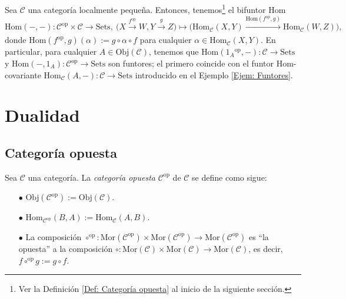\documentclass[tesis]{subfiles}
\begin{document}
\begin{Ejem}\label{Ejem: Bifuntor}
    Sea $\mathscr{C}$ una categoría localmente pequeña. Entonces, tenemos\footnote{Ver la Definición \ref{Def: Categoría opuesta} al inicio de la siguiente sección.} el bifuntor Hom
    \[
        \text{Hom}(-,-):\mathscr{C}^\text{op}\times\mathscr{C}\to \text{Sets}, \ \big( X\xrightarrow[]{f^\text{op}}W, Y\xrightarrow[]{g}Z \big) \mapsto \big( \text{Hom}_\mathscr{C}(X,Y)\xrightarrow[]{\text{Hom}(f^\text{op},g)} \text{Hom}_\mathscr{C}(W,Z) \big),
    \] 
    donde $\text{Hom}(f^\text{op},g)(\alpha) := g\circ\alpha\circ f$ para cualquier $\alpha\in\text{Hom}_\mathscr{C}(X,Y)$. En particular, para cualquier $A\in\text{Obj}(\mathscr{C})$, tenemos que $\text{Hom}(1_A{}^\text{op},-):\mathscr{C}\to \text{Sets}$ y $\text{Hom}(-,1_A):\mathscr{C}^\text{op}\to \text{Sets}$ son funtores; el primero coincide con el funtor Hom-covariante $\text{Hom}_\mathscr{C}(A,-):\mathscr{C}\to \text{Sets}$ introducido en el Ejemplo \ref{Ejem: Funtores}.
\end{Ejem}

\section{Dualidad} \label{Sec: Dualidad}

\subsection*{Categoría opuesta} \label{Ssec: Categoría opuesta}

\begin{Def} \label{Def: Categoría opuesta}
    
    Sea $\mathscr{C}$ una categoría. La \emph{categoría opuesta} $\mathscr{C}^{\text{op}}$ de $\mathscr{C}$ se define como sigue:
    
    \begin{itemize}
        \item[$\bullet$] $\text{Obj}(\mathscr{C}^{\text{op}}):=\text{Obj}(\mathscr{C})$.
    
        \item[$\bullet$] $\text{Hom}_{\mathscr{C}^{\text{op}}}(B,A):=\text{Hom}_\mathscr{C}(A,B)$.
    
        \item[$\bullet$] La composición $\circ^{\text{op}}:\text{Mor}(\mathscr{C}^{\text{op}})\times\text{Mor}(\mathscr{C}^{\text{op}})\to \text{Mor}(\mathscr{C}^{\text{op}})$ es ``la opuesta'' a la composición $\circ:\text{Mor}(\mathscr{C})\times\text{Mor}(\mathscr{C})\to \text{Mor}(\mathscr{C})$, es decir, $f\circ^{\text{op}} g:= g\circ f$.
    \end{itemize}
\end{Def}
    
\end{document}
